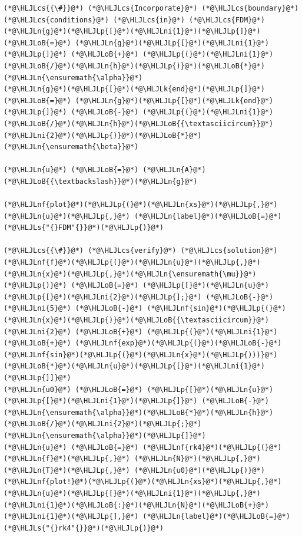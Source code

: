 \documentclass[12pt,a4paper]{article}
\newcommand{\HLJLk}[1]{\textcolor[RGB]{148,91,176}{\textbf{#1}}}
\newcommand{\HLJLn}[1]{#1}
\newcommand{\HLJLnf}[1]{\textcolor[RGB]{66,102,213}{#1}}
\newcommand{\HLJLs}[1]{\textcolor[RGB]{201,61,57}{#1}}
\newcommand{\HLJLni}[1]{\textcolor[RGB]{59,151,46}{#1}}
\newcommand{\HLJLoB}[1]{\textcolor[RGB]{102,102,102}{\textbf{#1}}}
\newcommand{\HLJLp}[1]{#1}
\newcommand{\HLJLcs}[1]{\textcolor[RGB]{153,153,119}{\textit{#1}}}
\begin{document}
\begin{lstlisting}
(*@\HLJLcs{{\#}}@*) (*@\HLJLcs{Incorporate}@*) (*@\HLJLcs{boundary}@*) (*@\HLJLcs{conditions}@*) (*@\HLJLcs{in}@*) (*@\HLJLcs{FDM}@*)
(*@\HLJLn{g}@*)(*@\HLJLp{[}@*)(*@\HLJLni{1}@*)(*@\HLJLp{]}@*) (*@\HLJLoB{=}@*) (*@\HLJLn{g}@*)(*@\HLJLp{[}@*)(*@\HLJLni{1}@*)(*@\HLJLp{]}@*) (*@\HLJLoB{+}@*) (*@\HLJLp{(}@*)(*@\HLJLni{1}@*)(*@\HLJLoB{/}@*)(*@\HLJLn{h}@*)(*@\HLJLp{)}@*)(*@\HLJLoB{*}@*)(*@\HLJLn{\ensuremath{\alpha}}@*)
(*@\HLJLn{g}@*)(*@\HLJLp{[}@*)(*@\HLJLk{end}@*)(*@\HLJLp{]}@*) (*@\HLJLoB{=}@*) (*@\HLJLn{g}@*)(*@\HLJLp{[}@*)(*@\HLJLk{end}@*)(*@\HLJLp{]}@*) (*@\HLJLoB{-}@*) (*@\HLJLp{(}@*)(*@\HLJLni{1}@*)(*@\HLJLoB{/}@*)(*@\HLJLn{h}@*)(*@\HLJLoB{{\textasciicircum}}@*)(*@\HLJLni{2}@*)(*@\HLJLp{)}@*)(*@\HLJLoB{*}@*)(*@\HLJLn{\ensuremath{\beta}}@*)

(*@\HLJLn{u}@*) (*@\HLJLoB{=}@*) (*@\HLJLn{A}@*)(*@\HLJLoB{{\textbackslash}}@*)(*@\HLJLn{g}@*)

(*@\HLJLnf{plot}@*)(*@\HLJLp{(}@*)(*@\HLJLn{xs}@*)(*@\HLJLp{,}@*) (*@\HLJLn{u}@*)(*@\HLJLp{,}@*) (*@\HLJLn{label}@*)(*@\HLJLoB{=}@*)(*@\HLJLs{"{}FDM"{}}@*)(*@\HLJLp{)}@*)

(*@\HLJLcs{{\#}}@*) (*@\HLJLcs{verify}@*) (*@\HLJLcs{solution}@*)
(*@\HLJLnf{f}@*)(*@\HLJLp{(}@*)(*@\HLJLn{u}@*)(*@\HLJLp{,}@*)(*@\HLJLn{x}@*)(*@\HLJLp{,}@*)(*@\HLJLn{\ensuremath{\mu}}@*)(*@\HLJLp{)}@*) (*@\HLJLoB{=}@*) (*@\HLJLp{[}@*)(*@\HLJLn{u}@*)(*@\HLJLp{[}@*)(*@\HLJLni{2}@*)(*@\HLJLp{];}@*) (*@\HLJLoB{-}@*)(*@\HLJLni{5}@*) (*@\HLJLoB{-}@*) (*@\HLJLnf{sin}@*)(*@\HLJLp{(}@*)(*@\HLJLn{x}@*)(*@\HLJLp{)}@*)(*@\HLJLoB{{\textasciicircum}}@*)(*@\HLJLni{2}@*) (*@\HLJLoB{+}@*) (*@\HLJLp{(}@*)(*@\HLJLni{1}@*) (*@\HLJLoB{+}@*) (*@\HLJLnf{exp}@*)(*@\HLJLp{(}@*)(*@\HLJLoB{-}@*)(*@\HLJLnf{sin}@*)(*@\HLJLp{(}@*)(*@\HLJLn{x}@*)(*@\HLJLp{)))}@*)(*@\HLJLoB{*}@*)(*@\HLJLn{u}@*)(*@\HLJLp{[}@*)(*@\HLJLni{1}@*)(*@\HLJLp{]]}@*)
(*@\HLJLn{u0}@*) (*@\HLJLoB{=}@*) (*@\HLJLp{[}@*)(*@\HLJLn{u}@*)(*@\HLJLp{[}@*)(*@\HLJLni{1}@*)(*@\HLJLp{]}@*) (*@\HLJLoB{-}@*) (*@\HLJLn{\ensuremath{\alpha}}@*)(*@\HLJLoB{*}@*)(*@\HLJLn{h}@*)(*@\HLJLoB{/}@*)(*@\HLJLni{2}@*)(*@\HLJLp{;}@*) (*@\HLJLn{\ensuremath{\alpha}}@*)(*@\HLJLp{]}@*)
(*@\HLJLn{u}@*) (*@\HLJLoB{=}@*) (*@\HLJLnf{rk4}@*)(*@\HLJLp{(}@*)(*@\HLJLn{f}@*)(*@\HLJLp{,}@*) (*@\HLJLn{N}@*)(*@\HLJLp{,}@*) (*@\HLJLn{T}@*)(*@\HLJLp{,}@*) (*@\HLJLn{u0}@*)(*@\HLJLp{)}@*)
(*@\HLJLnf{plot!}@*)(*@\HLJLp{(}@*)(*@\HLJLn{xs}@*)(*@\HLJLp{,}@*) (*@\HLJLn{u}@*)(*@\HLJLp{[}@*)(*@\HLJLni{1}@*)(*@\HLJLp{,}@*)(*@\HLJLni{1}@*)(*@\HLJLoB{:}@*)(*@\HLJLn{N}@*)(*@\HLJLoB{+}@*)(*@\HLJLni{1}@*)(*@\HLJLp{],}@*) (*@\HLJLn{label}@*)(*@\HLJLoB{=}@*)(*@\HLJLs{"{}rk4"{}}@*)(*@\HLJLp{)}@*)
\end{lstlisting}
\end{document}
